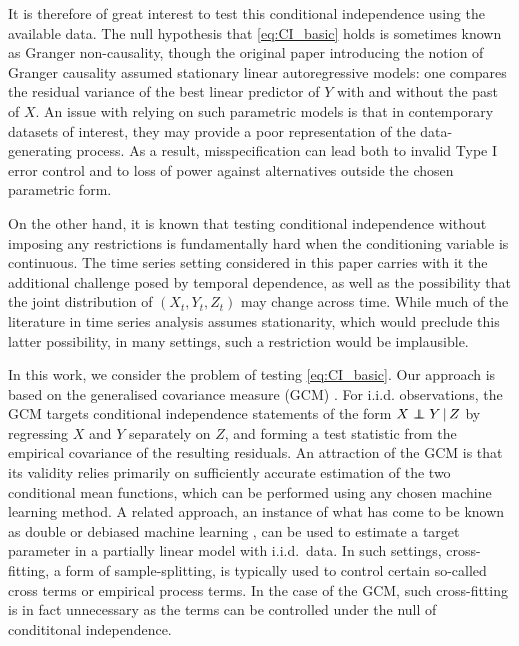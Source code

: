 \documentclass[12pt]{article}
\newcommand\independent{\protect\mathpalette{\protect\independenT}{\perp}}
\def\independenT#1#2{\mathrel{\rlap{$#1#2$}\mkern2mu{#1#2}}}
\newcommand\given{\,|\,}
\numberwithin{equation}{section}
\begin{document}
It is therefore of great interest to test this conditional independence using the available data. The null hypothesis that \eqref{eq:CI_basic} holds is sometimes known as Granger non-causality, though the original paper \citep{granger1969investigating} introducing the notion of Granger causality assumed stationary linear autoregressive models: one compares the residual variance of the best linear predictor of \(Y\) with and without the past of \(X\). An issue with relying on such parametric models is that in contemporary datasets of interest, they may provide a poor representation of the data-generating process. As a result, misspecification can lead both to invalid Type I error control and to loss of power against alternatives outside the chosen parametric form.

On the other hand, it is known \citep{shah2020hardness} that testing conditional independence without imposing any restrictions is fundamentally hard when the conditioning variable is continuous.
The time series setting considered in this paper carries with it the additional challenge posed by temporal dependence, as well as the possibility that the joint distribution of $(X_t, Y_t, Z_t)$ may change across time. While much of the literature in time series analysis assumes stationarity, which would preclude this latter possibility, in many settings, such a restriction would be implausible.

In this work, we consider the problem of testing \eqref{eq:CI_basic}.
Our approach is based on the generalised covariance measure (GCM)
\citep{shah2020hardness}. For i.i.d. observations, the GCM targets conditional
independence statements of the form \(X \independent Y \given Z\) by regressing
\(X\) and \(Y\) separately on \(Z\), and forming a test statistic from the
empirical covariance of the resulting residuals. An attraction of the GCM is that its validity relies primarily on sufficiently accurate estimation of the two conditional mean functions, which can be performed using any chosen machine learning method.
A related approach, an instance of what has come to be known as double or debiased machine learning \citep{chen2022debiased}, can be used to estimate a target parameter in a partially linear model with i.i.d.\ data. In such settings, cross-fitting, a form of sample-splitting, is typically used to control certain so-called cross terms or empirical process terms. In the case of the GCM, such cross-fitting is in fact unnecessary as the terms can be controlled under the null of condititonal independence.
\end{document}
